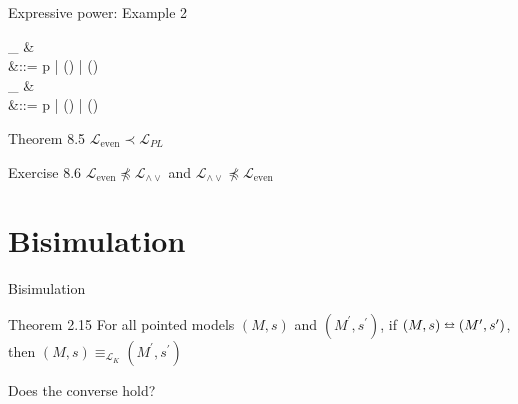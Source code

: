 \documentclass{beamer}
\newcommand{\lang}{\mathcal{L}}
\begin{document}
\begin{frame}{Expressive power: Example 2}
	\begin{flalign*}
		\lang_{} &\\
			&\phi ::= p | \left(\phi \triangledown \phi\right) | \left(\phi \leftrightarrow \phi\right)\\
		\lang_{\wedge\vee} &\\
			&\phi ::= p | \left(\phi \wedge \phi\right) | \left(\phi \vee \phi\right)
	\end{flalign*}
	\begin{block}{Theorem 8.5}
		$\lang_{\text{even}} \prec \lang_{PL}$
	\end{block}
	\begin{block}{Exercise 8.6}
		$\lang_{\text{even}} \not\preceq \lang_{\wedge\vee}$ and $\lang_{\wedge\vee} \not\preceq \lang_{\text{even}}$
	\end{block}
\end{frame}


\section*{Bisimulation}

\begin{frame}{Bisimulation}
	\begin{block}{Theorem 2.15}
		For all pointed models $(M,s)$ and $(M^\prime,s^\prime)$, if $(M,s) \leftrightarroweq (M^\prime,s^\prime)$, then $(M,s) \equiv_{\lang_K} (M^\prime,s^\prime)$
	\end{block} \pause
	Does the converse hold?
\end{frame}
\end{document}

